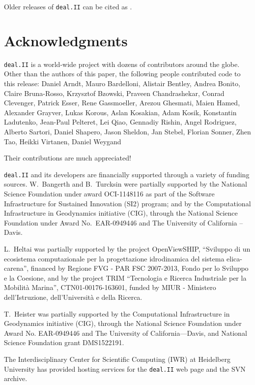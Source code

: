 \documentclass{ansarticle-preprint}
\newcommand{\specialword}[1]{\texttt{#1}}
\newcommand{\dealii}{{\specialword{deal.II}}}
\begin{document}
Older releases of \dealii{} can be cited as \cite{dealII80,dealII81,dealII82,dealII83}.

\nocite{BangerthKanschat1999}

\section{Acknowledgments}

\dealii{} is a world-wide project with dozens of contributors around the
globe. Other than the authors of this paper, the following people contributed code to
this release:
%
%
Daniel Arndt,
Mauro Bardelloni,
Alistair Bentley,
Andrea Bonito,
Claire Bruna-Rosso,
Krzysztof Bzowski,
Praveen Chandrashekar,
Conrad Clevenger,
Patrick Esser,
Rene Gassmoeller,
Arezou Ghesmati,
Maien Hamed,
Alexander Grayver,
Lukas Korous,
Aslan Kosakian,
Adam Kosik,
Konstantin Ladutenko,
Jean-Paul Pelteret,
Lei Qiao,
Gennadiy Rishin,
Angel Rodriguez,
Alberto Sartori,
Daniel Shapero,
Jason Sheldon,
Jan Stebel,
Florian Sonner,
Zhen Tao,
Heikki Virtanen,
Daniel Weygand


Their contributions are much appreciated!


\dealii{} and its developers are financially supported through a
variety of funding sources. W.~Bangerth and B.~Turcksin were partially
supported by the National Science Foundation under award OCI-1148116
as part of the Software Infrastructure for Sustained Innovation (SI2)
program; and by the Computational Infrastructure in Geodynamics initiative
(CIG), through the National Science Foundation under Award
No.~EAR-0949446 and The University of California -- Davis.

L.~Heltai was partially supported by the project OpenViewSHIP,
``Sviluppo di un ecosistema computazionale per la progettazione
idrodinamica del sistema elica-carena'', financed by Regione FVG - PAR
FSC 2007-2013, Fondo per lo Sviluppo e la Coesione, and by the project
TRIM ``Tecnologia e Ricerca Industriale per la Mobilit\`a Marina'',
CTN01-00176-163601, funded by MIUR -  Ministero dell'Istruzione,
dell'Universit\`a e della Ricerca.

T.~Heister was partially supported by the Computational Infrastructure in
Geodynamics initiative (CIG), through the National Science Foundation under Award No. EAR-0949446 and The University of California—Davis, and National Science Foundation grant DMS1522191.

The Interdisciplinary Center for Scientific Computing (IWR) at Heidelberg University has provided
hosting services for the \dealii{} web page and the SVN archive.



{}

\end{document}
